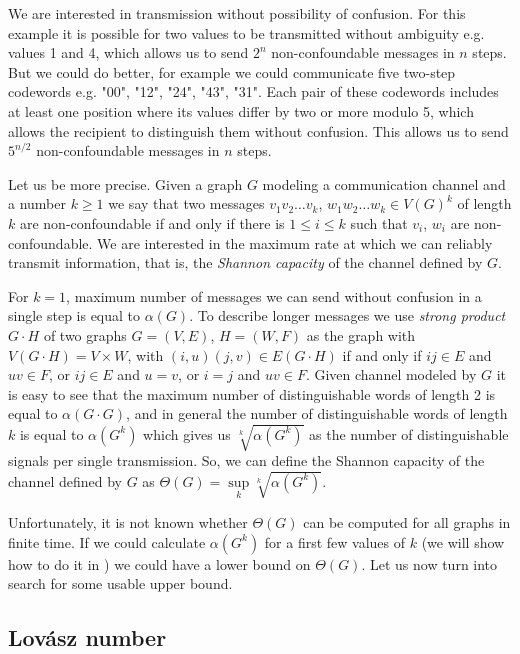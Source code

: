 We are interested in transmission without possibility of confusion. For this example it is possible for two values to be transmitted without ambiguity e.g. values 1 and 4, which allows us to send $2^n$ non-confoundable messages in $n$ steps. But we could do better, for example we could communicate five two-step codewords e.g. "00", "12", "24", "43", "31". Each pair of these codewords includes at least one position where its values differ by two or more modulo 5, which allows the recipient to distinguish them without confusion.  This allows us to send $5^{n / 2}$ non-confoundable messages in $n$ steps.

Let us be more precise. Given a graph $G$ modeling a communication channel and a number $k \geq 1$ we say that two messages $v_1v_2\ldots v_k$, $w_1w_2\ldots w_k \in V(G)^k$ of length $k$ are non-confoundable if and only if there is $1 \leq i \leq k$ such that $v_i$, $w_i$ are non-confoundable. We are interested in the maximum rate at which we can reliably transmit information, that is, the \emph{Shannon capacity} of the channel defined by $G$.

For $k = 1$, maximum number of messages we can send without confusion in a single step is equal to $\alpha(G)$. To describe longer messages we use \emph{strong product} $G \cdot H$ of two graphs $G = (V, E)$, $H = (W, F)$ as the graph with $V(G \cdot H) = V \times W$, with $(i, u)(j, v) \in E(G \cdot H)$ if and only if $ij \in E$ and $uv \in F$, or $ij \in E$ and $u = v$, or $i = j$ and $uv \in F$. Given channel modeled by $G$ it is easy to see that the maximum number of distinguishable words of length 2 is equal to $\alpha(G \cdot G)$, and in general the number of distinguishable words of length $k$ is equal to $\alpha(G^k)$ which gives us $\sqrt[k]{\alpha(G^k)}$ as the number of distinguishable signals per single transmission. So, we can define the Shannon capacity of the channel defined by $G$ as $\Theta(G) = \sup\limits_k \sqrt[k]{\alpha(G^k)}$.

Unfortunately, it is not known whether $\Theta(G)$ can be computed for all graphs in finite time. If we could calculate $\alpha(G^k)$ for a first few values of $k$ (we will show how to do it in ) we could have a lower bound on $\Theta(G)$. Let us now turn into search for some usable upper bound.

\subsection{Lovász number}


